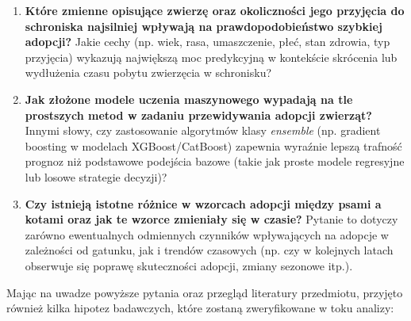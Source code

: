 \begin{enumerate}\itemsep2pt
\item \label{rq:1} \textbf{Które zmienne opisujące zwierzę oraz okoliczności jego przyjęcia do schroniska najsilniej wpływają na prawdopodobieństwo szybkiej adopcji?} Jakie cechy (np. wiek, rasa, umaszczenie, płeć, stan zdrowia, typ przyjęcia) wykazują największą moc predykcyjną w kontekście skrócenia lub wydłużenia czasu pobytu zwierzęcia w schronisku?
\item \label{rq:2} \textbf{Jak złożone modele uczenia maszynowego wypadają na tle prostszych metod w zadaniu przewidywania adopcji zwierząt?} Innymi słowy, czy zastosowanie algorytmów klasy \emph{ensemble} (np. gradient boosting w modelach XGBoost/CatBoost) zapewnia wyraźnie lepszą trafność prognoz niż podstawowe podejścia bazowe (takie jak proste modele regresyjne lub losowe strategie decyzji)?
\item \label{rq:3} \textbf{Czy istnieją istotne różnice w wzorcach adopcji między psami a kotami oraz jak te wzorce zmieniały się w czasie?} Pytanie to dotyczy zarówno ewentualnych odmiennych czynników wpływających na adopcje w zależności od gatunku, jak i trendów czasowych (np. czy w kolejnych latach obserwuje się poprawę skuteczności adopcji, zmiany sezonowe itp.).
\end{enumerate}

Mając na uwadze powyższe pytania oraz przegląd literatury przedmiotu, przyjęto również kilka hipotez badawczych, które zostaną zweryfikowane w toku analizy:

